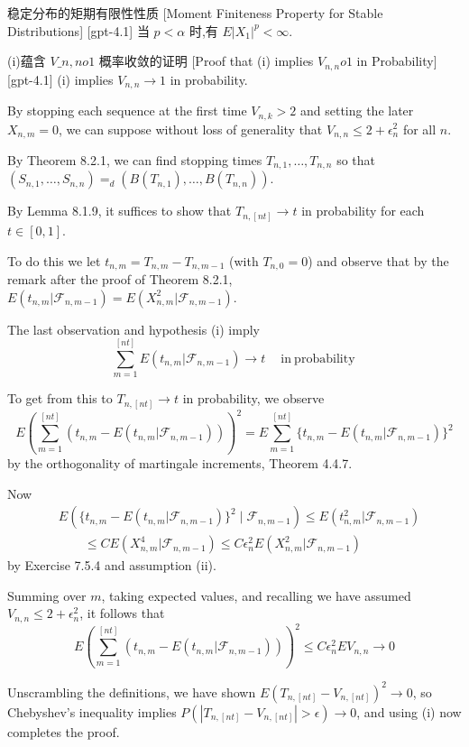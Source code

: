 \documentclass[UTF8]{ctexart}
\begin{document}
    
    
    \begin{ppt}
        {稳定分布的矩期有限性性质}
        [Moment Finiteness Property for Stable Distributions]
        [gpt-4.1]
        当 $p < \alpha$ 时,有 $E | X_1 |^p < \infty$.
    \end{ppt}
    
    
    
    \begin{prf}
        {(i)蕴含 $V\_{n, n} 	o 1$ 概率收敛的证明}
        [Proof that (i) implies $V_{n, n} 	o 1$ in Probability]
        [gpt-4.1]
        (i) implies $V_{n, n} \to 1$ in probability.

By stopping each sequence at the first time $V_{n, k} > 2$ and setting the later $X_{n, m} = 0$, we can suppose without loss of generality that $V_{n, n} \leq 2 + \epsilon_n^2$ for all $n$.

By Theorem 8.2.1, we can find stopping times $T_{n, 1}, \ldots, T_{n, n}$ so that $(S_{n, 1}, \ldots, S_{n, n}) =_d (B(T_{n, 1}), \ldots, B(T_{n, n}))$.

By Lemma 8.1.9, it suffices to show that $T_{n, [nt]} \to t$ in probability for each $t \in [0, 1]$.

To do this we let $t_{n, m} = T_{n, m} - T_{n, m-1}$ (with $T_{n, 0} = 0$) and observe that by the remark after the proof of Theorem 8.2.1, $E(t_{n, m} | \mathcal{F}_{n, m-1}) = E(X_{n, m}^2 | \mathcal{F}_{n, m-1})$.

The last observation and hypothesis (i) imply
\[
\sum_{m=1}^{[nt]} E(t_{n, m} | \mathcal{F}_{n, m-1}) \to t \quad \mathrm{~in~probability~}
\]

To get from this to $T_{n, [nt]} \to t$ in probability, we observe
\[
E\left( \sum_{m=1}^{[nt]} (t_{n, m} - E(t_{n, m} | \mathcal{F}_{n, m-1})) \right)^2 = E \sum_{m=1}^{[nt]} \{ t_{n, m} - E(t_{n, m} | \mathcal{F}_{n, m-1}) \}^2
\]
by the orthogonality of martingale increments, Theorem 4.4.7.

Now
\[
\begin{array}{rl}
& E\left( \{ t_{n, m} - E(t_{n, m} | \mathcal{F}_{n, m-1}) \}^2 \mid \mathcal{F}_{n, m-1} \right) \leq E(t_{n, m}^2 | \mathcal{F}_{n, m-1}) \\
& \qquad \leq C E(X_{n, m}^4 | \mathcal{F}_{n, m-1}) \leq C \epsilon_n^2 E(X_{n, m}^2 | \mathcal{F}_{n, m-1})
\end{array}
\]
by Exercise 7.5.4 and assumption (ii).

Summing over $m$, taking expected values, and recalling we have assumed $V_{n, n} \leq 2 + \epsilon_n^2$, it follows that
\[
E\left( \sum_{m=1}^{[nt]} (t_{n, m} - E(t_{n, m} | \mathcal{F}_{n, m-1})) \right)^2 \leq C \epsilon_n^2 E V_{n, n} \to 0
\]

Unscrambling the definitions, we have shown $E( T_{n, [nt]} - V_{n, [nt]} )^2 \to 0$, so Chebyshev's inequality implies $P( | T_{n, [nt]} - V_{n, [nt]} | > \epsilon ) \to 0$, and using (i) now completes the proof.

    \end{prf}
    
\end{document}
